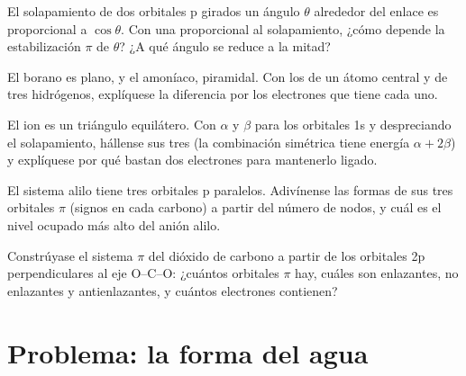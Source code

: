 \begin{exercise}[$\star\star$]\label{exo:b2:fragment-orbitals:8}
El solapamiento de dos orbitales p girados un ángulo $\theta$ alrededor del enlace es
proporcional a $\cos\theta$. Con una  proporcional al
solapamiento, ¿cómo depende la estabilización $\pi$ de $\theta$? ¿A qué ángulo
se reduce a la mitad?
\end{exercise}

\begin{exercise}[$\star\star$]\label{exo:b2:fragment-orbitals:9}
El borano  es plano, y el amoníaco, piramidal. Con los  de un
átomo central y de tres hidrógenos, explíquese la diferencia por los electrones que tiene cada uno.
\end{exercise}

\begin{exercise}[$\star\star\star$]\label{exo:b2:fragment-orbitals:10}
El ion  es un triángulo equilátero. Con $\alpha$ y $\beta$ para los orbitales 1s
y despreciando el solapamiento, hállense sus tres  (la combinación simétrica
tiene energía $\alpha + 2\beta$) y explíquese por qué bastan dos electrones para
mantenerlo ligado.
\end{exercise}

\begin{exercise}[$\star\star\star$]\label{exo:b2:fragment-orbitals:11}
El sistema alilo  tiene tres orbitales p paralelos. Adivínense las formas de
sus tres orbitales $\pi$ (signos en cada carbono) a partir del número de nodos, y cuál
es el nivel ocupado más alto del anión alilo.
\end{exercise}

\begin{exercise}[$\star\star\star$]\label{exo:b2:fragment-orbitals:12}
Constrúyase el sistema $\pi$ del dióxido de carbono a partir de los orbitales 2p perpendiculares al
eje O--C--O: ¿cuántos orbitales $\pi$ hay, cuáles son enlazantes, no enlazantes y
antienlazantes, y cuántos electrones contienen?
\end{exercise}

\section{Problema: la forma del agua}

